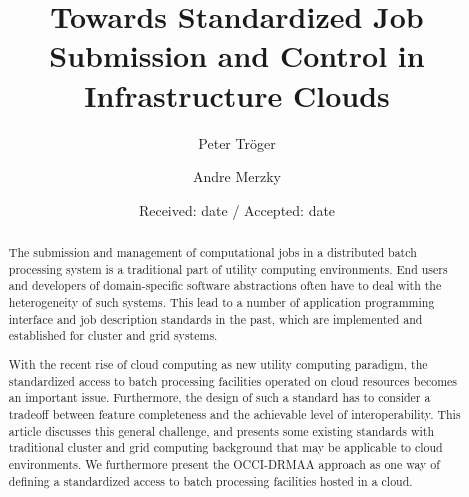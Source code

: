 \documentclass[twocolumn]{svjour3}       %
\begin{document}
\title{Towards Standardized Job Submission and Control in Infrastructure Clouds}
\author{Peter Tr\"oger \and Andre Merzky}

\date{Received: date / Accepted: date}

\maketitle

\makeglossaries


\begin{abstract}
The submission and management of computational jobs in a distributed batch processing system is a traditional part of utility computing environments. End users and developers of domain-specific software abstractions often have to deal with the heterogeneity of such systems. This lead to a number of application programming interface and job description standards in the past, which are implemented and established for cluster and grid systems.

With the recent rise of cloud computing as new utility computing paradigm, the standardized access to batch processing facilities operated on cloud resources becomes an important issue. Furthermore, the design of such a standard has to consider a tradeoff between feature completeness and the achievable level of interoperability. This article discusses this general challenge, and presents some existing standards with traditional cluster and grid computing background that may be applicable to cloud environments. We furthermore present the OCCI-DRMAA approach as one way of defining a standardized access to batch processing facilities hosted in a cloud. 
\end{abstract}
\end{document}
